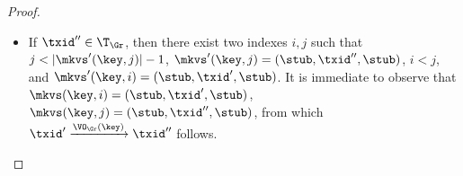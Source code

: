\begin{proof}
\begin{enumerate}
\begin{itemize}
\begin{itemize}
\item If $\txid'' \in \T_{\Gr}$, then there exist two indexes $i,j$ such that 
$j < \lvert \mkvs'(\key, j) \rvert - 1$, $\mkvs'(\key, j) = (\stub, \txid'', \stub)$, 
$i < j$, and $\mkvs'(\key, i) = (\stub, \txid', \stub)$. It is immediate to observe 
that $\mkvs(\key, i) = (\stub, \txid', \stub)$, $\mkvs(\key, j) = (\stub, \txid'', \stub)$, 
from which $\txid' \xrightarrow{\VO_{\Gr}(\key)} \txid''$ follows. 
\end{itemize}
\end{itemize}

\end{enumerate}
\end{proof}
